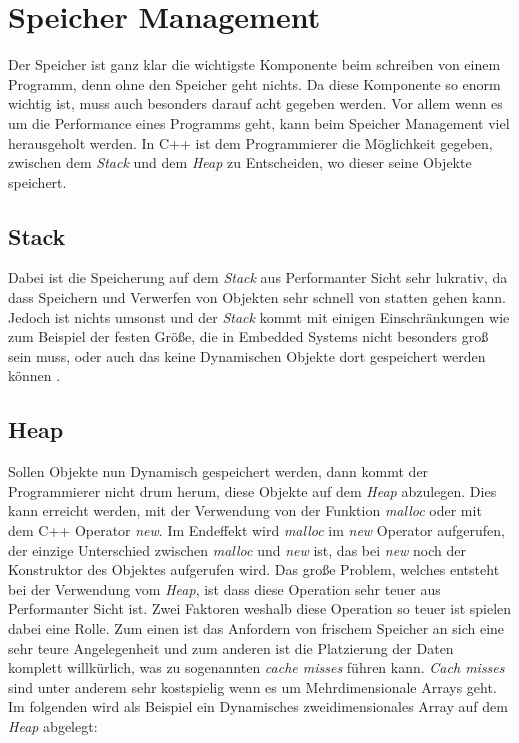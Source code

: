 \section{Speicher Management}\label{sec:speicherman}
Der Speicher ist ganz klar die wichtigste Komponente beim schreiben von einem Programm, denn ohne
den Speicher geht nichts. Da diese Komponente so enorm wichtig ist, muss auch besonders darauf
acht gegeben werden. Vor allem wenn es um die Performance eines Programms geht, kann beim
Speicher Management viel herausgeholt werden. In C++ ist dem Programmierer die Möglichkeit
gegeben, zwischen dem \emph{Stack} und dem \emph{Heap} zu Entscheiden, wo dieser seine Objekte
speichert.

\subsection{Stack}
Dabei ist die Speicherung auf dem \emph{Stack} aus Performanter Sicht sehr lukrativ, da dass
Speichern und Verwerfen von Objekten sehr schnell von statten gehen kann. Jedoch ist nichts
umsonst und der \emph{Stack} kommt mit einigen Einschränkungen wie zum Beispiel der festen Größe,
die in Embedded Systems nicht besonders groß sein muss, oder auch das keine Dynamischen Objekte
dort gespeichert werden können \cite{C++HighPer2}.

\subsection{Heap}
Sollen Objekte nun Dynamisch gespeichert werden, dann kommt der Programmierer nicht drum herum,
diese Objekte auf dem \emph{Heap} abzulegen. Dies kann erreicht werden, mit der Verwendung von
der Funktion \emph{malloc} oder mit dem C++ Operator \emph{new}. Im Endeffekt wird \emph{malloc}
im \emph{new} Operator aufgerufen, der einzige Unterschied zwischen \emph{malloc} und \emph{new}
ist, das bei \emph{new} noch der Konstruktor des Objektes aufgerufen wird. Das große Problem,
welches entsteht bei der Verwendung vom \emph{Heap}, ist dass diese Operation sehr teuer aus
Performanter Sicht ist. Zwei Faktoren weshalb diese Operation so teuer ist spielen dabei eine
Rolle. Zum einen ist das Anfordern von frischem Speicher an sich eine sehr teure Angelegenheit
und zum anderen ist die Platzierung der Daten komplett willkürlich, was zu sogenannten
\emph{cache misses} führen kann.
\newline
\newline
\emph{Cach misses} sind unter anderem sehr kostspielig wenn es um Mehrdimensionale Arrays geht.
Im folgenden wird als Beispiel ein Dynamisches zweidimensionales Array auf dem \emph{Heap} abgelegt:

